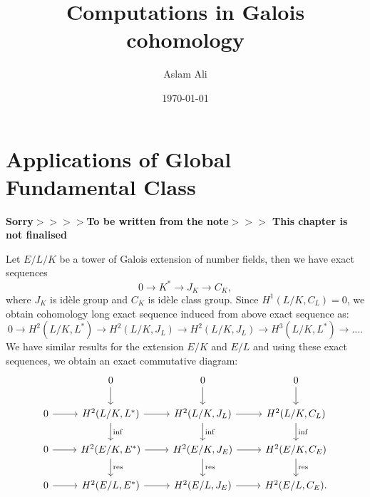 \documentclass{article}
\title{Computations in Galois cohomology}
\author{Aslam Ali }
\date{\today}
\theoremstyle{break}
\def\rest{\mathop{\mathrm{res}}\nolimits}
\def\inf{\mathop{\mathrm{inf}}\nolimits}
\begin{document}
\chapter{Applications of Global Fundamental Class} %

\label{Chapter5} %




\textbf{\huge{Sorry}$>>>>$To be written from the note$>>>$ This chapter is not finalised}


Let $E/L/K$ be a tower of Galois extension of number fields, then we have exact sequences
\[ 0 \rightarrow K^{*} \rightarrow J_K \rightarrow C_K,\]
where $J_K$ is id\`ele group and $C_K$ is id\`ele class group.
Since $H^{1}(L/K, C_L) =0$, we obtain cohomology long exact sequence  induced from above exact sequence as:
\[ 0 \rightarrow H^{2}(L/K, L^{*}) \rightarrow H^{2}(L/K ,J_L) \rightarrow H^{2}(L/K ,J_L) \rightarrow H^{3}(L/K , L^{*})\rightarrow \ldots .\]
We have similar results for the extension $E/K$ and $E/L$ and using these exact sequences, we obtain an exact commutative diagram:
\[\begin{tikzcd}
{ } & 0\arrow{d} & 0 \arrow{d} & 0\arrow{d} \\
0\arrow{r}  & H^{2}(L/K, L^{*} )\arrow{r}\arrow{d}{\inf} & H^{2}(L/K, J_{L} )\arrow{r}\arrow{d}{\inf} & H^{2}(L/K, C_{L} )\arrow{d}{\inf}\\
0\arrow{r}  & H^{2}(E/K, E^{*} )\arrow{r}\arrow{d}{\rest}  & H^{2}(E/K, J_{E} )\arrow{r}\arrow{d}{\rest} & H^{2}(E/K, C_{E} )\arrow{d}{\rest}\\   
0\arrow{r}  & H^{2}(E/L, E^{*} )\arrow{r} & H^{2}(E/L, J_{E} )\arrow{r}& H^{2}(E/L, C_{E} ).\\   
\end{tikzcd}
\]
\end{document}
